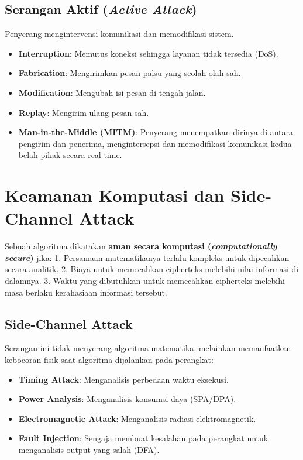 \documentclass[../main.tex]{subfiles}
\begin{document}
\subsection{Serangan Aktif (\textit{Active Attack})}
Penyerang mengintervensi komunikasi dan memodifikasi sistem.
\begin{itemize}
    \item \textbf{Interruption}: Memutus koneksi sehingga layanan tidak tersedia (DoS).
    \item \textbf{Fabrication}: Mengirimkan pesan palsu yang seolah-olah sah.
    \item \textbf{Modification}: Mengubah isi pesan di tengah jalan.
    \item \textbf{Replay}: Mengirim ulang pesan sah.
    \item \textbf{Man-in-the-Middle (MITM)}: Penyerang menempatkan dirinya di antara pengirim dan penerima, mengintersepsi dan memodifikasi komunikasi kedua belah pihak secara real-time.
\end{itemize}

\section{Keamanan Komputasi dan Side-Channel Attack}
Sebuah algoritma dikatakan \textbf{aman secara komputasi (\textit{computationally secure})} jika:
1. Persamaan matematikanya terlalu kompleks untuk dipecahkan secara analitik.
2. Biaya untuk memecahkan cipherteks melebihi nilai informasi di dalamnya.
3. Waktu yang dibutuhkan untuk memecahkan cipherteks melebihi masa berlaku kerahasiaan informasi tersebut.

\subsection{Side-Channel Attack}
Serangan ini tidak menyerang algoritma matematika, melainkan memanfaatkan kebocoran fisik saat algoritma dijalankan pada perangkat:
\begin{itemize}
    \item \textbf{Timing Attack}: Menganalisis perbedaan waktu eksekusi.
    \item \textbf{Power Analysis}: Menganalisis konsumsi daya (SPA/DPA).
    \item \textbf{Electromagnetic Attack}: Menganalisis radiasi elektromagnetik.
    \item \textbf{Fault Injection}: Sengaja membuat kesalahan pada perangkat untuk menganalisis output yang salah (DFA).
\end{itemize}
\end{document}
